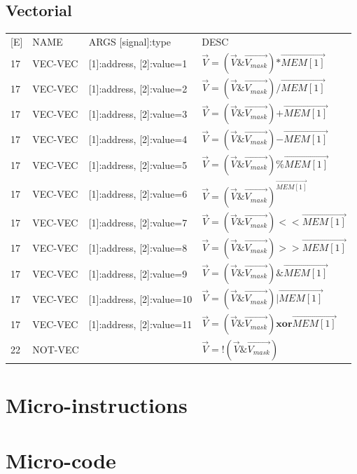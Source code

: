 \documentclass{scrreprt}
\begin{document}
    \section{Vectorial}
    \begin{tabular}{l | l | l  l}
    	[E] & NAME & ARGS [signal]:type & DESC \\
    	17 & VEC-VEC & [1]:address, [2]:value=1 & $\vec{V} = (\vec{V}\&\vec{V_{mask}}) \mathbf{*} \vec{MEM[1]}$\\  
    	17 & VEC-VEC & [1]:address, [2]:value=2 & $\vec{V} = (\vec{V}\&\vec{V_{mask}}) \mathbf{/} \vec{MEM[1]}$\\  
    	17 & VEC-VEC & [1]:address, [2]:value=3 & $\vec{V} = (\vec{V}\&\vec{V_{mask}}) \mathbf{+} \vec{MEM[1]}$\\  
    	17 & VEC-VEC & [1]:address, [2]:value=4 & $\vec{V} = (\vec{V}\&\vec{V_{mask}}) \mathbf{-} \vec{MEM[1]}$\\  
    	17 & VEC-VEC & [1]:address, [2]:value=5 & $\vec{V} = (\vec{V}\&\vec{V_{mask}}) \mathbf{\%} \vec{MEM[1]}$\\  
    	17 & VEC-VEC & [1]:address, [2]:value=6 & $\vec{V} = (\vec{V}\&\vec{V_{mask}})^{\vec{MEM[1]}}$\\  
    	17 & VEC-VEC & [1]:address, [2]:value=7 & $\vec{V} = (\vec{V}\&\vec{V_{mask}}) \mathbf{<<}\vec{MEM[1]}$\\  
    	17 & VEC-VEC & [1]:address, [2]:value=8 & $\vec{V} = (\vec{V}\&\vec{V_{mask}}) \mathbf{>>}\vec{MEM[1]}$\\  
    	17 & VEC-VEC & [1]:address, [2]:value=9 & $\vec{V} = (\vec{V}\&\vec{V_{mask}}) \mathbf{\&}\vec{MEM[1]}$\\  
    	17 & VEC-VEC & [1]:address, [2]:value=10 &$\vec{V} = (\vec{V}\&\vec{V_{mask}}) \mathbf{|}\vec{MEM[1]}$\\  
    	17 & VEC-VEC & [1]:address, [2]:value=11 & $\vec{V} = (\vec{V}\&\vec{V_{mask}})  \mathbf{xor}\vec{MEM[1]}$\\  
    	22 & NOT-VEC & & $\vec{V} = !(\vec{V}\&\vec{V_{mask}})$\\ 
    \end{tabular}
	\chapter{Micro-instructions}
	
	

    \chapter{Micro-code}
\end{document}
